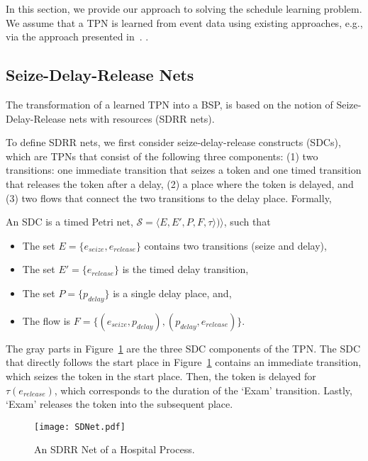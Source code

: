 In this section, we provide
our approach to solving the 
schedule learning problem. 
We assume that a TPN
is learned from event data using
existing approaches, e.g., via the approach presented 
in~\cite{DBLP:conf/bpm/SenderovichRGMM15}.
.

\subsection{Seize-Delay-Release Nets}

The transformation of a learned TPN into a BSP,
is based on the notion 
of Seize-Delay-Release nets with resources (SDRR nets). 

To define SDRR nets, 
we first consider seize-delay-release constructs (SDCs), 
which are 
TPNs that consist of the following three components:
(1) two transitions: one immediate transition that seizes a token and 
one timed transition that releases the token after a delay, (2) a place where the
token is delayed, and (3) two flows that connect the two transitions to the delay place. 
Formally,
\begin{mydef}  \label{def:sdc}
	An SDC is a timed Petri net, 
	$\mathcal{S} = \langle E, E' , P , F, \tau \rangle)\rangle$, such that 
	\begin{itemize}
		\item The set $E = \{ e_{seize}, e_{release} \}$ contains two transitions (seize and delay), 
		\item The set $E' = \{e_{release}\}$ is the timed delay transition, 
		\item The set $P = \{p_{delay}\}$ is a single delay place, and,
		\item The flow is $F = \{ (e_{seize}, p_{delay}), (p_{delay}, e_{release})\}$.
	\end{itemize}
\end{mydef} The gray parts in Figure~\ref{fig:sdr-net} are the three 
SDC components of the TPN.
The SDC that directly follows the start place in Figure~\ref{fig:sdr-net} contains an immediate
transition, which seizes the token in the start place. 
Then, the token is delayed for $\tau(e_{release})$,
which corresponds to the duration of the `Exam'
transition. Lastly, `Exam' releases the token into the subsequent place.

\begin{figure}[t!]
	\centering
	\texttt{[image: SDNet.pdf]}
	\caption{An SDRR Net of a Hospital Process.}
	\label{fig:sdr-net}  
	\vspace{-1em}
\end{figure}



